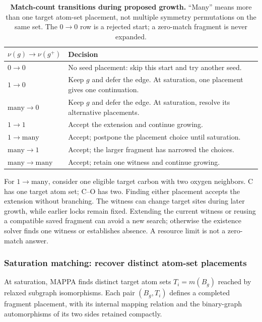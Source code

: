 \begin{table}[H]
\centering\small
\caption{\textbf{Match-count transitions during proposed growth.} ``Many'' means more than one target atom-set placement, not multiple symmetry permutations on the same set. The $0\to0$ row is a rejected start; a zero-match fragment is never expanded.}
\label{tab:growth-transitions}
\begin{tabular}{@{}>{\centering\arraybackslash}p{.22\linewidth}>{\raggedright\arraybackslash}p{.72\linewidth}@{}}
\toprule
$\nu(g)\to\nu(g^+)$ & Decision\\
\midrule
$0\to0$ & No seed placement: skip this start and try another seed.\\
$1\to0$ & Keep $g$ and defer the edge. At saturation, one placement gives one continuation.\\
$\mathrm{many}\to0$ & Keep $g$ and defer the edge. At saturation, resolve its alternative placements.\\
$1\to1$ & Accept the extension and continue growing.\\
$1\to\mathrm{many}$ & Accept; postpone the placement choice until saturation.\\
$\mathrm{many}\to1$ & Accept; the larger fragment has narrowed the choices.\\
$\mathrm{many}\to\mathrm{many}$ & Accept; retain one witness and continue growing.\\
\bottomrule
\end{tabular}
\end{table}

For $1\to\mathrm{many}$, consider one eligible target carbon with two oxygen neighbors. C has one target atom set; C--O has two. Finding either placement accepts the extension without branching. The witness can change target sites during later growth, while earlier locks remain fixed. Extending the current witness or reusing a compatible saved fragment can avoid a new search; otherwise the existence solver finds one witness or establishes absence. A resource limit is not a zero-match answer.

\subsubsection{Saturation matching: recover distinct atom-set placements}
\label{sec:completion}

At saturation, MAPPA finds distinct target atom sets $T_i=m(B_g)$ reached by relaxed subgraph isomorphisms. Each pair $(B_g,T_i)$ defines a completed fragment placement, with its internal mapping relation and the binary-graph automorphisms of its two sides retained compactly.

